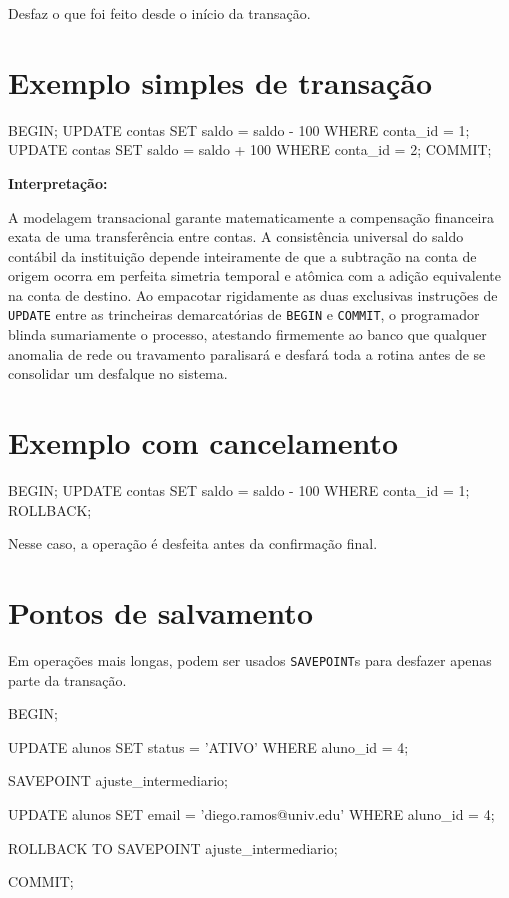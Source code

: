 Desfaz o que foi feito desde o início da transação.

\section{Exemplo simples de transação}

\begin{sqlcode}
BEGIN;
UPDATE contas SET saldo = saldo - 100 WHERE conta_id = 1;
UPDATE contas SET saldo = saldo + 100 WHERE conta_id = 2;
COMMIT;
\end{sqlcode}

\textbf{Interpretação:}

A modelagem transacional garante matematicamente a compensação financeira exata de uma transferência entre contas. A consistência universal do saldo contábil da instituição depende inteiramente de que a subtração na conta de origem ocorra em perfeita simetria temporal e atômica com a adição equivalente na conta de destino. Ao empacotar rigidamente as duas exclusivas instruções de \texttt{UPDATE} entre as trincheiras demarcatórias de \texttt{BEGIN} e \texttt{COMMIT}, o programador blinda sumariamente o processo, atestando firmemente ao banco que qualquer anomalia de rede ou travamento paralisará e desfará toda a rotina antes de se consolidar um desfalque no sistema.

\section{Exemplo com cancelamento}

\begin{sqlcode}
BEGIN;
UPDATE contas SET saldo = saldo - 100 WHERE conta_id = 1;
ROLLBACK;
\end{sqlcode}

Nesse caso, a operação é desfeita antes da confirmação final.

\section{Pontos de salvamento}

Em operações mais longas, podem ser usados \texttt{SAVEPOINT}s para desfazer apenas parte da transação.

\begin{sqlcode}
BEGIN;

UPDATE alunos
SET status = 'ATIVO'
WHERE aluno_id = 4;

SAVEPOINT ajuste_intermediario;

UPDATE alunos
SET email = 'diego.ramos@univ.edu'
WHERE aluno_id = 4;

ROLLBACK TO SAVEPOINT ajuste_intermediario;

COMMIT;
\end{sqlcode}

